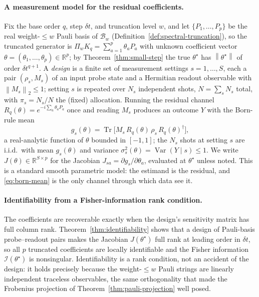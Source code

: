 \documentclass[aps,prxquantum,reprint,superscriptaddress,nofootinbib,amsmath,amssymb]{revtex4-2}
\newcommand{\norm}[1]{\left\lVert #1 \right\rVert}
\newcommand{\Tr}{\operatorname{Tr}}
\newcommand{\cB}{\mathcal{B}}
\newcommand{\dt}{\delta t}
\begin{document}
\paragraph{A measurement model for the residual coefficients.} Fix the base order $q$, step $\dt$, and truncation level $w$, and let $\{P_1,\dots,P_p\}$ be the real weight-$\leq w$ Pauli basis of $\cB_w$ (Definition~\ref{def:spectral-truncation}), so the truncated generator is $\Pi_wK_q=\sum_{a=1}^{p}\theta_a P_a$ with unknown coefficient vector $\theta=(\theta_1,\dots,\theta_p)\in\mathbb{R}^{p}$; by Theorem~\ref{thm:small-step} the true $\theta^\star$ has $\norm{\theta^\star}$ of order $\dt^{q+1}$. A \emph{design} is a finite set of measurement settings $s=1,\dots,S$, each a pair $(\rho_s,M_s)$ of an input probe state and a Hermitian readout observable with $\norm{M_s}_2\le1$; setting $s$ is repeated over $N_s$ independent shots, $N=\sum_sN_s$ total, with $\pi_s=N_s/N$ the (fixed) allocation. Running the residual channel $R_q(\theta)=e^{-i\sum_a\theta_aP_a}$ once and reading $M_s$ produces an outcome $Y$ with the Born-rule mean
\begin{equation}
    g_s(\theta)=\Tr\!\bigl[M_s\,R_q(\theta)\,\rho_s\,R_q(\theta)^\dagger\bigr],
    \label{eq:born-mean}
\end{equation}
a real-analytic function of $\theta$ bounded in $[-1,1]$; the $N_s$ shots at setting $s$ are i.i.d.\ with mean $g_s(\theta)$ and variance $\sigma_s^2(\theta)=\operatorname{Var}(Y\mid s)\le1$. We write $J(\theta)\in\mathbb{R}^{S\times p}$ for the Jacobian $J_{sa}=\partial g_s/\partial\theta_a$, evaluated at $\theta^\star$ unless noted. This is a standard smooth parametric model: the estimand is the residual, and \eqref{eq:born-mean} is the only channel through which data see it.

\paragraph{Identifiability from a Fisher-information rank condition.} The coefficients are recoverable exactly when the design's sensitivity matrix has full column rank. Theorem~\ref{thm:identifiability} shows that a design of Pauli-basis probe--readout pairs makes the Jacobian $J(\theta^\star)$ full rank at leading order in $\dt$, so all $p$ truncated coefficients are locally identifiable and the Fisher information $\mathcal{I}(\theta^\star)$ is nonsingular. Identifiability is a rank condition, not an accident of the design: it holds precisely because the weight-$\leq w$ Pauli strings are linearly independent traceless observables, the same orthogonality that made the Frobenius projection of Theorem~\ref{thm:pauli-projection} well posed.
\end{document}
